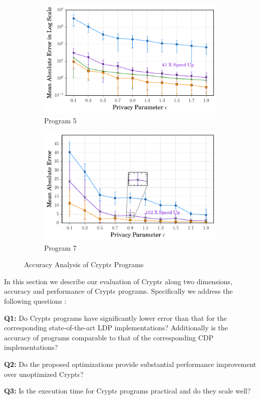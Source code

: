 \begin{figure}[ht]
\begin{subfigure}[b]{0.25\linewidth}
    \centering    \includegraphics[width=1\linewidth]{5_final.pdf}
        \caption{Program 5}
        \label{fig:P5}\end{subfigure}%
      \begin{subfigure}[b]{0.25\linewidth}
    \centering    \includegraphics[width=1\linewidth]{7_final.pdf}
        \caption{Program 7}
        \label{fig:P7}
    \end{subfigure}
   \caption{Accuracy Analysis of Crypt$\epsilon$ Programs}
   \label{accuracy}
\end{figure}
In this section we describe our evaluation of Crypt$\epsilon$ along two dimensions, accuracy and  performance of Crypt$\epsilon$ programs. Specifically we address the following questions : \squishlist \item \textbf{Q1:} Do Crypt$\epsilon$ programs have significantly lower error than that for the corresponding state-of-the-art \textsf{LDP} implementations? Additionally is the accuracy of \system programs comparable to that of the corresponding \textsf{CDP} implementations? \item \textbf{Q2:} Do the proposed optimizations provide substantial performance improvement over unoptimized Crypt$\epsilon$? \item \textbf{Q3:} Is the execution time for Crypt$\epsilon$ programs practical and do they scale well? \squishend
